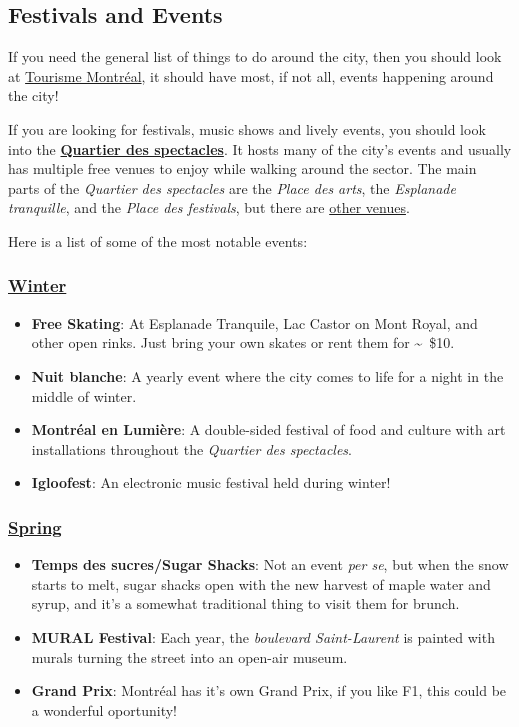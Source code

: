 \subsection{Festivals and Events}
If you need the general list of things to do around the city, then you should look at \href{https://www.mtl.org/en/what-to-do/festivals-and-events}{Tourisme Montréal}, it should have most, if not all, events happening around the city! 

  \noindent If you are looking for festivals, music shows and lively events, you should look into the \textbf{\href{https://www.quartierdesspectacles.com/en/festivals-and-events}{Quartier des spectacles}}. It hosts many of the city's events and usually has multiple free venues to enjoy while walking around the sector. The main parts of the \textit{Quartier des spectacles} are the \textit{Place des arts}, the \textit{Esplanade tranquille}, and the \textit{Place des festivals}, but there are \href{https://www.quartierdesspectacles.com/fr/places-publiques}{other venues}.

Here is a list of some of the most notable events:

\subsubsection{\href{https://www.mtl.org/en/experience/montreal-winter-festivals-shine-bright}{Winter}}
\begin{itemize}
    \item \textbf{Free Skating}: At Esplanade Tranquile, Lac Castor on Mont Royal, and other open rinks. Just bring your own skates or rent them for \sim ~\$10.
    \item \textbf{Nuit blanche}: A yearly event where the city comes to life for a night in the middle of winter.
    \item \textbf{Montréal en Lumière}: A double-sided festival of food and culture with art installations throughout the \textit{Quartier des spectacles}.
    \item \textbf{Igloofest}: An electronic music festival held during winter!
\end{itemize}

\subsubsection{\href{https://www.mtl.org/en/experience/spring-activities}{Spring}}
\begin{itemize}
    \item \textbf{Temps des sucres/Sugar Shacks}: Not an event \textit{per se}, but when the snow starts to melt, sugar shacks open with the new harvest of maple water and syrup, and it's a somewhat traditional thing to visit them for brunch.
    \item \textbf{MURAL Festival}: Each year, the \textit{boulevard Saint-Laurent} is painted with murals turning the street into an open-air museum.
    \item \textbf{Grand Prix}: Montréal has it's own Grand Prix, if you like F1, this could be a wonderful oportunity!
\end{itemize}

